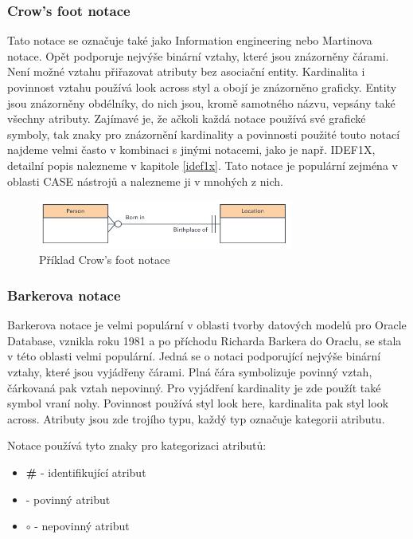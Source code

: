 \documentclass[czech,bachelor,public,dept460,male,oneside]{diploma}
\begin{document}
	\subsubsection{Crow's foot notace}
	Tato notace se označuje také jako Information engineering nebo Martinova notace. Opět podporuje nejvýše binární vztahy, které jsou znázorněny čárami. Není možné vztahu přiřazovat atributy bez asociační entity. Kardinalita i povinnost vztahu používá look across styl a obojí je znázorněno graficky. Entity jsou znázorněny obdélníky, do nich jsou, kromě samotného názvu, vepsány také všechny atributy. Zajímavé je, že ačkoli každá notace používá své grafické symboly, tak znaky pro znázornění kardinality a povinnosti použité touto notací najdeme velmi často v kombinaci s jinými notacemi, jako je např. IDEF1X, detailní popis nalezneme v kapitole \ref{idef1x}. Tato notace je populární zejména v oblasti CASE nástrojů a nalezneme ji v mnohých z nich.
	
	\begin{figure}[!h]
		\centering
		\includegraphics[width=0.75\textwidth]{Figures/NotationExCrow}
		\caption[Příklad Crow's foot notace]{Příklad Crow's foot notace \cite{whatIsERD}}
	\end{figure}
	
	\subsubsection{Barkerova notace}
	Barkerova notace je velmi populární v oblasti tvorby datových modelů pro Oracle Database, vznikla roku 1981 a po příchodu Richarda Barkera do Oraclu, se stala v této oblasti velmi populární. Jedná se o notaci podporující nejvýše binární vztahy, které jsou vyjádřeny čárami. Plná čára symbolizuje povinný vztah, čárkovaná pak vztah nepovinný. Pro vyjádření kardinality je zde použít také symbol vraní nohy. Povinnost používá styl look here, kardinalita pak styl look across. Atributy jsou zde trojího typu, každý typ označuje kategorii atributu. 
	
	Notace používá tyto znaky pro kategorizaci atributů:
	
	\begin{itemize}
		\item \textbf{\#} - identifikující atribut
		\item \textbf{\textasteriskcentered} - povinný atribut
		\item \textbf{$\circ$} - nepovinný atribut
	\end{itemize}
\end{document}
